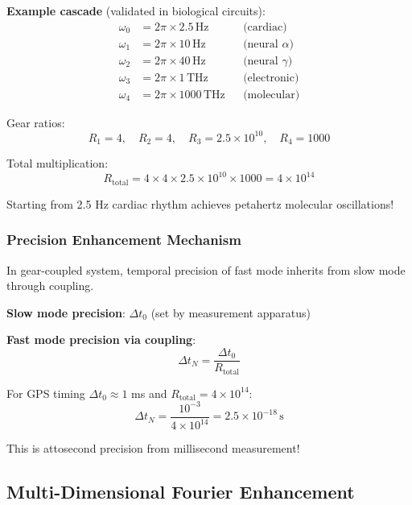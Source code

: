 \documentclass[11pt,onecolumn]{article}
\begin{document}
\textbf{Example cascade} (validated in biological circuits):
\begin{align}
\omega_0 &= 2\pi \times 2.5\,\text{Hz} &&\text{(cardiac)} \\
\omega_1 &= 2\pi \times 10\,\text{Hz} &&\text{(neural } \alpha) \\
\omega_2 &= 2\pi \times 40\,\text{Hz} &&\text{(neural } \gamma) \\
\omega_3 &= 2\pi \times 1\,\text{THz} &&\text{(electronic)} \\
\omega_4 &= 2\pi \times 1000\,\text{THz} &&\text{(molecular)}
\end{align}

Gear ratios:
\begin{equation}
R_1 = 4, \quad R_2 = 4, \quad R_3 = 2.5 \times 10^{10}, \quad R_4 = 1000
\end{equation}

Total multiplication:
\begin{equation}
R_{\text{total}} = 4 \times 4 \times 2.5 \times 10^{10} \times 1000 = 4 \times 10^{14}
\end{equation}

Starting from 2.5 Hz cardiac rhythm achieves petahertz molecular oscillations!

\subsubsection{Precision Enhancement Mechanism}

In gear-coupled system, temporal precision of fast mode inherits from slow mode through coupling.

\textbf{Slow mode precision}: $\Delta t_0$ (set by measurement apparatus)

\textbf{Fast mode precision via coupling}:
\begin{equation}
\Delta t_N = \frac{\Delta t_0}{R_{\text{total}}}
\end{equation}

For GPS timing $\Delta t_0 \approx 1$ ms and $R_{\text{total}} = 4 \times 10^{14}$:
\begin{equation}
\Delta t_N = \frac{10^{-3}}{4 \times 10^{14}} = 2.5 \times 10^{-18}\,\text{s}
\end{equation}

This is attosecond precision from millisecond measurement!

\subsection{Multi-Dimensional Fourier Enhancement}
\end{document}
